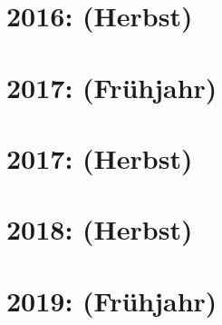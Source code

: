 \documentclass{lehramt-informatik-haupt}
\begin{document}
\section{2016: (Herbst)}


\section{2017: (Frühjahr)}


\section{2017: (Herbst)}


\section{2018: (Herbst)}


\section{2019: (Frühjahr)}

\end{document}
